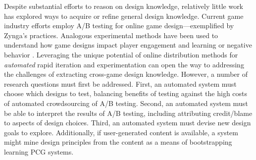 \documentclass[conference]{IEEEtran}
\newcommand{\mytodo}[1]{\textbf{[[#1]]}}
\begin{document}
Despite substantial efforts to reason on design knowledge, relatively little work has explored ways to acquire or refine general design knowledge. 
Current game industry efforts employ A/B testing for online game design---exemplified by Zynga's practices.
Analogous experimental methods have been used to understand how game designs impact player engagement and learning \cite{lomas2013:opt-edugame-challenge} or negative behavior \cite{lin2013:toxic-behav}.
Leveraging the unique potential of online distribution methods for {\em automated} rapid iteration and experimentation can open the way to addressing the challenges of extracting cross-game design knowledge.
%
However, a number of research questions must first be addressed. 
First, an automated system must choose which designs to test, balancing benefits of testing against the high costs of automated crowdsourcing of A/B testing.
Second, an automated system must be able to interpret the results of A/B testing, including attributing credit/blame to aspects of design choices. 
Third, an automated system must devise new design goals to explore.
%
Additionally, if user-generated content is available, a system might mine design principles from the content as a means of bootstrapping learning PCG systems.



\end{document}
